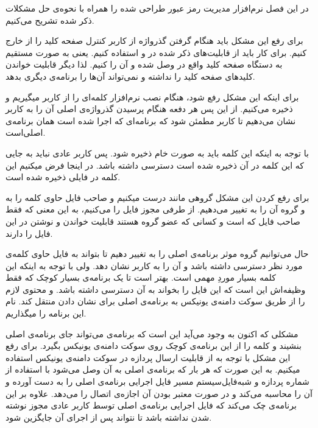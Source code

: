 
در این فصل نرم‌افزار مدیریت رمز عبور طراحی شده را همراه با نحوه‌ی حل مشکلات ذکر شده تشریح می‌کنیم.


برای رفع این مشکل باید هنگام گرفتن گذرواژه از کاربر کنترل صفحه کلید را از  خارج کنیم. برای کار باید از قابلیت‌های ذکر شده در  و   استفاده کنیم. یعنی به صورت مستقیم به دستگاه صفحه کلید واقع در  وصل شده و آن را  کنیم. لذا دیگر  قابلیت خواندن کلید‌های صفحه کلید را نداشته و نمی‌تواند آن‌ها را برنامه‌ی دیگری بدهد.


برای اینکه این مشکل رفع شود، هنگام نصب نرم‌افزار کلمه‌ای را از کاربر میگیریم و ذخیره می‌کنیم. از این پس هر دفعه هنگام پرسیدن گذرواژه‌ی اصلی آن را به کاربر نشان می‌دهیم تا کاربر مطمئن شود که برنامه‌ای که اجرا شده است همان برنامه‌ی اصلی‌است.

با توجه به اینکه این کلمه باید به صورت خام ذخیره شود. پس کاربر عادی نباید به جایی که این کلمه در آن ذخیره شده است دسترسی داشته باشد. در اینجا فرض میکنیم این کلمه در فایلی ذخیره شده است. 

برای رفع کردن این مشکل گروهی مانند  درست میکنیم و صاحب فایل حاوی کلمه را به  و گروه آن را به  تغییر می‌دهیم. از طرفی مجوز فایل را   می‌کنیم، به این معنی که فقط صاحب فایل که  است و کسانی که عضو گروه  هستند قابلیت خواندن و نوشتن در این فایل را دارند. 

حال می‌توانیم گروه موثر برنامه‌ی اصلی را به  تغییر دهیم تا بتواند به فایل حاوی کلمه‌ی مورد نظر دسترسی داشته باشد و آن را به کاربر نشان دهد. ولی با توجه به اینکه این کلمه بسیار موردِ مهمی است. بهتر است تا یک برنامه‌ی بسیار کوچک که فقط وظیفه‌اش این است که این فایل را بخواند به آن دسترسی داشته باشد. و محتوی لازم را از طریق سوکت دامنه‌ی یونیکس به برنامه‌ی اصلی برای نشان دادن منتقل کند. نام این برنامه را  میگذاریم.

مشکلی که اکنون به وجود می‌آید این است که برنامه‌ی  می‌تواند جای برنامه‌ی اصلی بنشیند و کلمه را از این برنامه‌ی کوچک روی سوکت دامنه‌ی یونیکس بگیرد.
برای رفع این مشکل با توجه به  از قابلیت ارسال  پردازه در سوکت دامنه‌ی یونیکس استفاده میکنیم. به این صورت که  هر بار که برنامه‌ی اصلی به آن وصل می‌شود با استفاده از شماره پردازه و شبه‌فایل‌سیستم  مسیر فایل اجرایی برنامه‌ی اصلی را به دست آورده و  آن را محاسبه می‌کند و در صورت معتبر بودن آن اجازه‌ی اتصال را می‌دهد. علاوه بر این برنامه‌ی  چک می‌کند که فایل اجرایی برنامه‌ی اصلی توسط کاربر عادی مجوز نوشته شدن نداشته باشد تا  نتواند پس از اجرای آن جایگزین شود.


